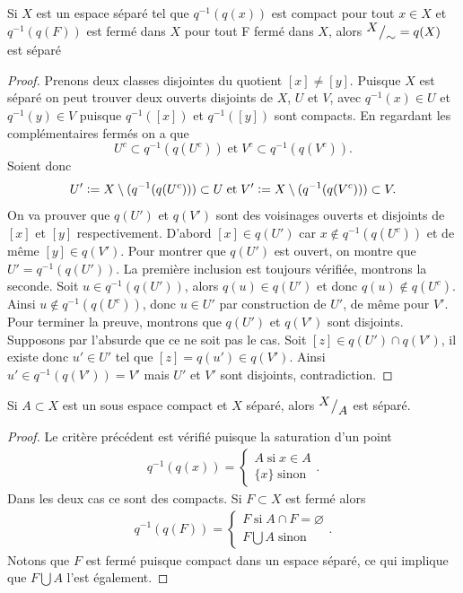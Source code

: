 \documentclass[main.tex]{subfiles}
\begin{document}
	\begin{prop}
		Si $X$ est un espace séparé tel que $q^{-1}(q(x))$ est compact pour tout  $x\in X$ et $q^{-1}(q(F))$ est fermé dans $X$ pour tout F fermé dans $X$, alors ${^{\textstyle X}\big/_{\textstyle \sim}} = q(X)$ est séparé
	\end{prop}
	\begin{proof}
		Prenons deux classes disjointes du quotient $[x] \neq [y]$. Puisque $X$ est séparé on peut trouver deux ouverts disjoints de $X$, $U$ et $V$, avec $q^{-1}(x) \in U$ et  $q^{-1}(y) \in V$ puisque $q^{-1}([x])$ et  $q^{-1}([y])$ sont compacts. En regardant les complémentaires fermés on a que \[
			U^c \subset q^{-1}(q(U^c)) \; \text{et} \; V^c \subset q^{-1}(q(V^c))
		.\] Soient donc \[
		U' \vcentcolon= X\setminus(q^{-1}(q(U^c))) \subset U \; \text{et} \; V' \vcentcolon= X\setminus(q^{-1}(q(V^c))) \subset V
	.\]  On va prouver que $q(U')$ et  $q(V')$ sont des voisinages ouverts et disjoints de $[x]$ et $[y]$ respectivement. 
	D'abord $[x] \in q(U')$ car  $x \not\in q^{-1}(q(U^c))$ et de même  $[y] \in q(V')$. Pour montrer que $q(U')$ est ouvert, on montre que  $U' = q^{-1}(q(U'))$. La première inclusion est toujours vérifiée, montrons la seconde. Soit $u \in q^{-1}(q(U'))$, alors $q(u) \in q(U')$ et donc $q(u) \not\in q(U^c)$. Ainsi  $u \not\in q^{-1}(q(U^c))$, donc $u \in U'$ par construction de $U'$, de même pour $V'$. \\
	Pour terminer la preuve, montrons que $q(U')$ et  $q(V')$ sont disjoints. Supposons par l'absurde que ce ne soit pas le cas. Soit $[z] \in q(U')\cap q(V')$, il existe donc $u' \in U'$ tel que  $[z] = q(u') \in q(V')$. Ainsi $u' \in q^{-1}(q(V')) = V'$ mais  $U'$ et  $V'$ sont disjoints, contradiction.
	\end{proof}
	\begin{cor}
		Si $A \subset X$ est un sous espace compact et $X$ séparé, alors ${^{\textstyle X}\big/_{\textstyle A}}$ est séparé.
	\end{cor}
	\begin{proof}
		Le critère précédent est vérifié puisque la saturation d'un point
		\begin{align*}
			q^{-1}(q(x)) = \begin{cases}
				A \; \text{si} \; x \in A \\
				\{x\} \; \text{sinon} 
			\end{cases}
		.\end{align*} Dans les deux cas ce sont des compacts.
		Si $F \subset X$ est fermé alors 
		\begin{align*}
			q^{-1}(q(F)) = \begin{cases}
				F \; \text{si} \; A\cap F = \varnothing \\
				F \bigcup A \; \text{sinon}
			\end{cases}
		.\end{align*} Notons que $F$ est fermé puisque compact dans un espace séparé, ce qui implique que  $F \bigcup A$ l'est également.
	\end{proof}
\end{document}
